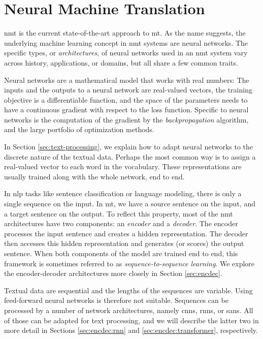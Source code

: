\chapter{Neural Machine Translation}
\label{chap:nmt}

\Ac{nmt} is the current state-of-the-art approach to \ac{mt}. As the name
suggests, the underlying machine learning concept in \ac{nmt} systems are
neural networks. The specific types, or \emph{architectures}, of neural
networks used in an \ac{nmt} system vary across history, applications, or
domains, but all share a few common traits.

Neural networks are a mathematical model that works with real numbers: The
inputs and the outputs to a neural network are real-valued vectors, the
training objective is a differentiable function, and the space of the
parameters needs to have a continuous gradient with respect to the loss
function. Specific to neural networks is the computation of the gradient by the
\emph{backpropagation} algorithm, and the large portfolio of optimization
methods.

In Section \ref{sec:text-processing}, we explain how to adapt neural networks
to the discrete nature of the textual data. Perhaps the most common way is to
assign a real-valued vector to each word in the vocabulary. These
representations are usually trained along with the whole network, end to end.

In \acs{nlp} tasks like sentence classification or language modeling, there is
only a single sequence on the input. In \ac{mt}, we have a source sentence on
the input, and a target sentence on the output. To reflect this property, most
of the \ac{nmt} architectures have two components: an \emph{encoder} and a
\emph{decoder}. The encoder processes the input sentence and creates a hidden
representation. The decoder then accesses this hidden representation and
generates (or scores) the output sentence. When both components of the model
are trained end to end, this framework is sometimes referred to as
\emph{sequence-to-sequence learning}. We explore the encoder-decoder
architectures more closely in Section \ref{sec:encdec}.

Textual data are sequential and the lengths of the sequences are
variable. Using feed-forward neural networks is therefore not
suitable. Sequences can be processed by a number of network architectures,
namely \acp{cnn}, \acp{rnn}, or \acp{san}. All of those can be adapted for text
processing, and we will describe the latter two in more detail in Sections
\ref{sec:encdec:rnn} and \ref{sec:encdec:transformer}, respectively.

